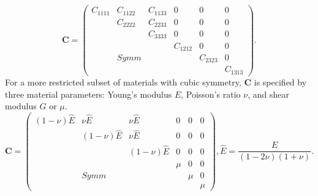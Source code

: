 \[
\mathbf{C}=
\begin{pmatrix}
C_{1111} & C_{1122} & C_{1133} & 0 & 0 & 0 \\
 & C_{2222} & C_{2233} & 0 & 0 & 0 \\
& & C_{3333} & 0 & 0 & 0 \\
& & & C_{1212} & 0 & 0 \\
 & Symm &  & & C_{2323} & 0 \\
 & & & & & C_{1313}
\end{pmatrix}.
\]
For a more restricted subset of materials with cubic symmetry, 
$\mathbf{C}$ is specified by three material parameters: Young's modulus $E$,
Poisson's ratio $\nu$, and shear modulus $G$ or $\mu$.
\[\mathbf{C}=
\begin{pmatrix}
(1-\nu)\hat{E} & \nu\hat{E} & \nu\hat{E} & 0 & 0 & 0 \\
&(1-\nu)\hat{E} & \nu\hat{E} & 0 & 0 & 0 \\
& &(1-\nu)\hat{E} & 0 & 0 & 0 \\
& & & \mu & 0 & 0 \\
& Symm &  & & \mu & 0 \\
& & & & & \mu
\end{pmatrix},\hat{E} = \frac{E}{(1-2\nu)(1+\nu)}.
\]

